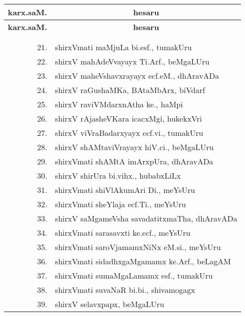 \begin{center}
\begin{minipage}[t]{7cm}
{\begin{longtable}{rl}
\end{longtable}}
\end{minipage}
\qquad\quad
\begin{minipage}[t]{7cm}
{\renewcommand{\arraystretch}{1.5}
\begin{longtable}{rl}
\hline
{\bf karx.saM.} & \multicolumn{1}{c}{\bf hesaru}\\[3pt]
\hline
\endfirsthead
\hline
{\bf karx.saM.} & \multicolumn{1}{c}{\bf hesaru}\\[3pt]
\hline
  & \\[-10pt]
\endhead
\endfoot
\endlastfoot
  & \\[-10pt]
21. & shirxVmati maMjuLa bi.esf., tumakUru\\
22. & shirxV mahAdeVvayayx Ti.Arf., beMgaLUru\\
23. & shirxV  maheVshavxrayayx ecf.eM., dhAravADa\\
24. & shirxV raGushaMKa, BAtaMbArx, biVdarf\\
25. & shirxV raviVMdarxnAtha ke., haMpi\\
26. & shirxV rAjasheVKara icacxMgi, hukekxVri\\
27. & shirxV  viVraBadarxyayx ecf.vi., tumakUru\\
28. & shirxV  shAMtaviVrayayx hiV.ci., beMgaLUru\\
29. & shirxVmati shAMtA imArxpUra, dhAravADa\\
30. & shirxV shirUra bi.vihx., hubabxLiLx\\
31. & shirxVmati shiVlAkumAri Di., meYsUru\\
32. & shirxVmati sheYlaja ecf.Ti., meYsUru\\
33. & shirxV saMgameVsha savadatitxmaTha, dhAravADa\\
34. & shirxVmati sarasavxti ke.ecf., meYsUru\\
35. & shirxVmati saroVjamamxNiNx eM.si., meYsUru\\
36. & shirxVmati sidadhxgaMgamamx ke.Arf., beLagAM\\
37. & shirxVmati sumaMgaLamamx esf., tumakUru\\
38. & shirxVmati suvaNaR bi.bi., shivamogagx\\
39. &  shirxV selavxpapx, beMgaLUru\\
\end{longtable}}
\end{minipage}
\end{center}
